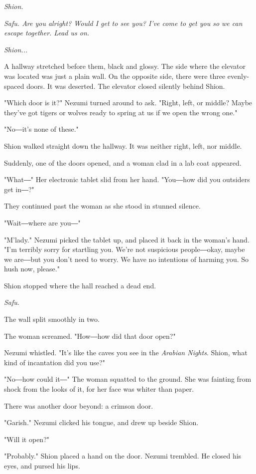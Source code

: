 \emph{Shion.}

\emph{Safu. Are you alright? Would I get to see you? I've come to get you so
	we can escape together. Lead us on.}

\emph{Shion...}

A hallway stretched before them, black and glossy. The side where the
elevator was located was just a plain wall. On the opposite side, there
were three evenly-spaced doors. It was deserted. The elevator closed
silently behind Shion.

"Which door is it?" Nezumi turned around to ask. "Right, left, or
middle? Maybe they've got tigers or wolves ready to spring at us if we
open the wrong one."

"No―it's none of these."

Shion walked straight down the hallway. It was neither right, left, nor
middle.

Suddenly, one of the doors opened, and a woman clad in a lab coat
appeared.

"What―" Her electronic tablet slid from her hand. "You―how did you
outsiders get in―?"

They continued past the woman as she stood in stunned silence.

"Wait―where are you―"

"M'lady." Nezumi picked the tablet up, and placed it back in the woman's
hand. "I'm terribly sorry for startling you. We're not suspicious
people―okay, maybe we are―but you don't need to worry. We have no
intentions of harming you. So hush now, please."

Shion stopped where the hall reached a dead end.

\emph{Safu.}

The wall split smoothly in two.

The woman screamed. "How―how did that door open?"

Nezumi whistled. "It's like the caves you see in the \emph{Arabian Nights}.
Shion, what kind of incantation did you use?"

"No―how could it―" The woman squatted to the ground. She was fainting
from shock from the looks of it, for her face was whiter than paper.

There was another door beyond: a crimson door.

"Garish." Nezumi clicked his tongue, and drew up beside Shion.~

"Will it open?"

"Probably." Shion placed a hand on the door. Nezumi trembled. He closed
his eyes, and pursed his lips.

